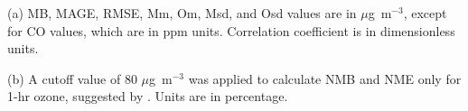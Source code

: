 \begin{table}
\begin{threeparttable}[b]
\begin{tabular}{lrrrrrrrrrr}
\bottomrule
\end{tabular}
\begin{tablenotes}
{\scriptsize
	\item[(a)] MB, MAGE, RMSE, Mm, Om, Msd, and Osd values are in $\mu$g~m$^{-3}$, except for CO values, which are in ppm units. Correlation coefficient is in dimensionless units.
	\item[(b)] A cutoff value of 80 $\mu$g~m$^{-3}$ was applied to calculate NMB and NME only for 1-hr ozone, suggested by \citet{Emery2017}. Units are in percentage.}
\end{tablenotes}
\end{threeparttable}
\end{table}